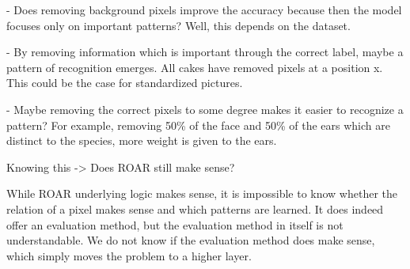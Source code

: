 - Does removing background pixels improve the accuracy because then the model focuses only on important patterns?
Well, this depends on the dataset.

- By removing information which is important through the correct label, maybe a pattern of recognition emerges.
All cakes have removed pixels at a position x. This could be the case for standardized pictures.

- Maybe removing the correct pixels to some degree makes it easier to recognize a pattern? For example, removing 50\% of the face and 50\% of the ears which are distinct to the species, more weight is given to the ears.



Knowing this -> Does ROAR still make sense?

While ROAR underlying logic makes sense, it is impossible to know whether the relation of a pixel makes sense and which patterns are learned. It does indeed offer an evaluation method, but the evaluation method in itself is not understandable. We do not know if the evaluation method does make sense, which simply moves the problem to a higher layer.





